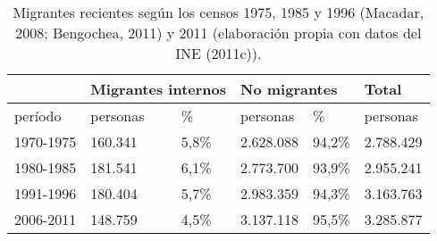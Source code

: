 \begin{table}[h]
    \centering
    \caption{Migrantes recientes según los censos 1975, 1985 y 1996 (Macadar, 2008; Bengochea, 2011) y 2011 (elaboración propia con datos del INE (2011c)).}
    \label{tab:my-table}
    \begin{tabular}{@{}llllll@{}}
    \toprule
     & \multicolumn{2}{l}{Migrantes internos} & \multicolumn{2}{l}{No migrantes} & Total \\ \midrule
    perí­odo & personas & \% & personas & \% & personas \\ \midrule
    1970-1975 & 160.341 & 5,8\% & 2.628.088 & 94,2\% & 2.788.429 \\
    1980-1985 & 181.541 & 6,1\% & 2.773.700 & 93,9\% & 2.955.241 \\
    1991-1996 & 180.404 & 5,7\% & 2.983.359 & 94,3\% & 3.163.763 \\
    2006-2011 & 148.759 & 4,5\% & 3.137.118 & 95,5\% & 3.285.877 \\ \bottomrule
    \end{tabular}
    \end{table}